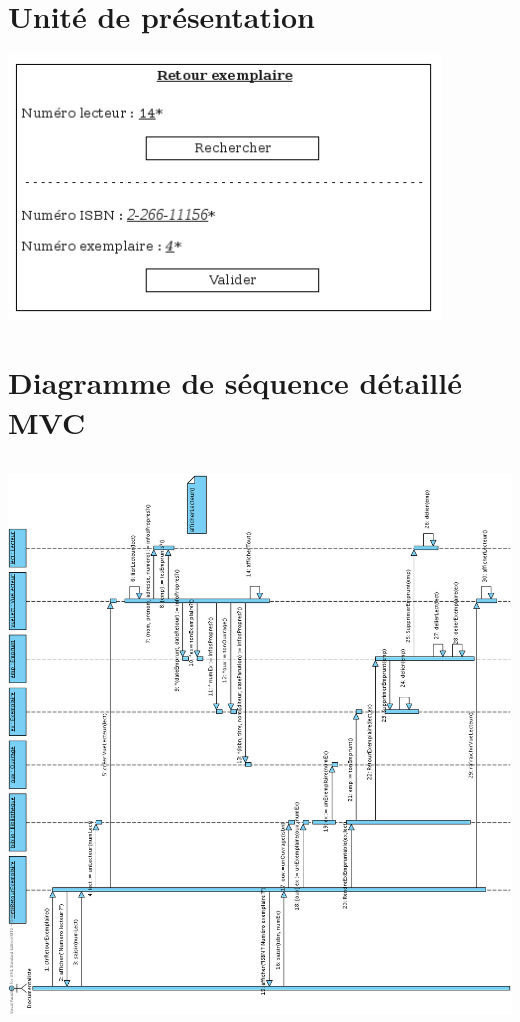 \documentclass[a4paper,10pt]{report}
\begin{document}
\section*{Unité de présentation}
\includegraphics[height=70mm]{UpRetourExemplaire.png}

\section*{Diagramme de séquence détaillé MVC}
\bigskip
\bigskip
{}
\includegraphics[height=150mm]{RetourExemplaireMVC.png}

\newpage
\end{document}
